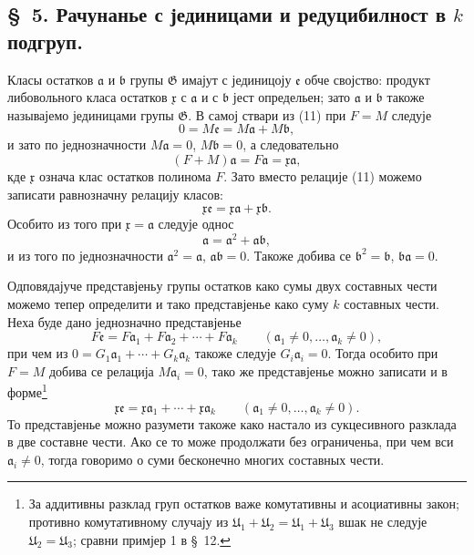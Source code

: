 ﻿\documentclass[11pt]{article}
\providecommand{\mG}{\mathfrak G}
\providecommand{\mU}{\mathfrak U}
\providecommand{\ma}{\mathfrak a}
\providecommand{\mb}{\mathfrak b}
\providecommand{\me}{\mathfrak e}
\providecommand{\mx}{\mathfrak x}
\begin{document}

\setcounter{footnote}{11}
\subsection*{\S~5. Рачунанье с јединицами и редуцибилност в \(k\) подгруп.}

Класы остатков \(\ma\) и \(\mb\) групы \(\mG\) имајут с јединицоју \(\me\) обче својство: продукт либовольного класа остатков \(\mx\) с \(\ma\) и с \(\mb\) јест определьен; зато \(\ma\) и \(\mb\) такоже называјемо јединицами групы \(\mG\). В самој ствари из (11) при \(F=M\) следује
\[
 0=M\me=M\ma+M\mb,
\]
и зато по једнозначности \(M\ma=0\), \(M\mb=0\), а следовательно
\[
 (F+M)\ma=F\ma=\mx\ma,
\]
кде \(\mx\) означа клас остатков полинома \(F\). Зато вместо релације (11) можемо записати равнозначну релацију класов:
\[
 \mx\me=\mx\ma+\mx\mb.
\]
Особито из того при \(\mx=\ma\) следује однос
\[
 \ma=\ma^2+\ma\mb,
\]
и из того по једнозначности \(\ma^2=\ma\), \(\ma\mb=0\). Такоже добива се \(\mb^2=\mb\), \(\mb\ma=0\).

Одповядајуче представјеньу групы остатков како сумы двух составных чести можемо тепер определити и тако представјенье како суму \(k\) составных чести. Неха буде дано једнозначно представјенье
\[
 F\me=F\ma_1+F\ma_2+\cdots+F\ma_k\qquad(\ma_1\ne0,\ldots,\ma_k\ne0),
\]
при чем из \(0=G_1\ma_1+\cdots+G_k\ma_k\) такоже следује \(G_i\ma_i=0\). Тогда особито при \(F=M\) добива се релација \(M\ma_i=0\), тако же представјенье можно записати и в форме\footnote{За аддитивны разклад груп остатков важе комутативны и асоциативны закон; противно комутативному случају из \(\mU_1+\mU_2=\mU_1+\mU_3\) вшак не следује \(\mU_2=\mU_3\); сравни примјер 1 в \S~12.}
\begin{equation}
 \mx\me=\mx\ma_1+\cdots+\mx\ma_k\qquad(\ma_1\ne0,\ldots,\ma_k\ne0).
\tag{12}
\end{equation}
То представјенье можно разумети такоже како настало из сукцесивного разклада в две составне чести. Ако се то може продолжати без ограниченьа, при чем вси \(\ma_i\ne0\), тогда говоримо о суми бесконечно многих составных чести.
\end{document}
